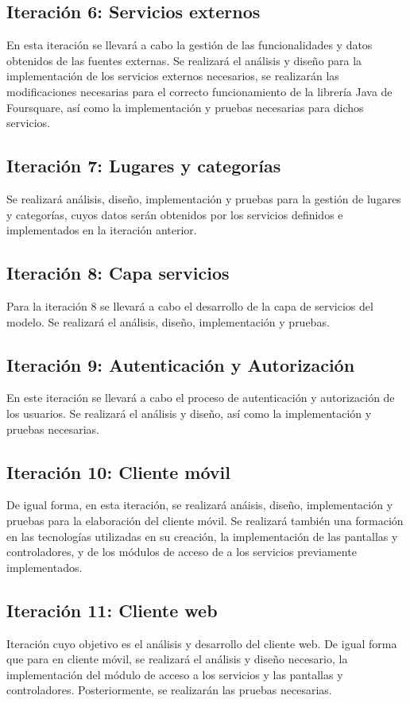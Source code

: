 \subsection{Iteración 6: Servicios externos}
En esta iteración se llevará a cabo la gestión de las funcionalidades y datos obtenidos de las fuentes externas. Se realizará el análisis y diseño para la implementación de los servicios externos necesarios, se realizarán las modificaciones necesarias para el correcto funcionamiento de la librería Java de Foursquare, así como la implementación y pruebas necesarias para dichos servicios.


\subsection{Iteración 7: Lugares y categorías}
Se realizará análisis, diseño, implementación y pruebas para la gestión de lugares y categorías, cuyos datos serán obtenidos por los servicios definidos e implementados en la iteración anterior.


\subsection{Iteración 8: Capa servicios}
Para la iteración 8 se llevará a cabo el desarrollo de la capa de servicios del modelo. Se realizará el análisis, diseño, implementación y pruebas.


\subsection{Iteración 9: Autenticación y Autorización}
En este iteración se llevará a cabo el proceso de autenticación y autorización de los usuarios. Se realizará el análisis y diseño, así como la implementación y pruebas necesarias.


\subsection{Iteración 10: Cliente móvil}
De igual forma, en esta iteración, se realizará anáisis, diseño, implementación y pruebas para la elaboración del cliente móvil. Se realizará también una formación en las tecnologías utilizadas en su creación, la implementación de las pantallas y controladores, y de los módulos de acceso de a los servicios previamente implementados.


\subsection{Iteración 11: Cliente web}
Iteración cuyo objetivo es el análisis y desarrollo del cliente web. De igual forma que para en cliente móvil, se realizará el análisis y diseño necesario, la implementación del módulo de acceso a los servicios y las pantallas y controladores. Posteriormente, se realizarán las pruebas necesarias.


